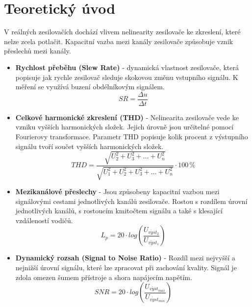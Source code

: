 \documentclass[a4paper, czech]{article}
\begin{document}
\section{Teoretický úvod}

V reálných zesilovačích dochází vlivem nelinearity zesilovače ke zkreslení, které nelze zcela potlačit.
Kapacitní vazba mezi kanály zesilovače způsobuje vznik přeslechů mezi kanály.

\begin{itemize}
    \item \textbf{Rychlost přeběhu (Slew Rate)} - dynamická vlastnost zesilovače, která popisuje jak rychle zesilovač sleduje skokovou změnu vstupního signálu. K měření se využívá buzení obdélníkovým signálem.
    \begin{equation*}
        SR = \frac{\Delta u}{\Delta t}
    \end{equation*}

    \item \textbf{Celkové harmonické zkreslení (THD)} - Nelinearita zesilovače vede ke vzniku vyšších harmonických složek. Jejich úrovně jsou určitelné pomocí Fourierovy transformace. Parametr THD popisuje kolik procent z výstupního signálu tvoří součet vyšších harmonických složek.
    \begin{equation*}
        THD = \frac{\sqrt{U_2^2 + U_3^2 + ... + U_n^2}}{\sqrt{U_1^2 + U_2^2 + U_3^2 + ... + U_n^2}} \cdot 100 \, \%
    \end{equation*}

    \item \textbf{Mezikanálové přeslechy} - Jsou způsobeny kapacitní vazbou mezi signálovými cestami jednotlivých kanálů zesilovače. Rostou s rozdílem úrovní jednotlivých kanálů, s rostoucím kmitočtem signálu a také s klesající vzdáleností vodičů.
    \begin{equation*}
        L_p = 20 \cdot log \left( \frac{U_{v \acute{y} st_2}}{U_{v \acute{y} st_1}} \right)
    \end{equation*}

    \item \textbf{Dynamický rozsah (Signal to Noise Ratio)} - Rozdíl mezi nejvyšší a nejnižší úrovní signálu, které lze zpracovat při zachování kvality. Signál je zdola omezen šumem přístroje a shora napájecím napětím.
    \begin{equation*}
        SNR = 20 \cdot log \left( \frac{U_{v \acute{y} st_{max}}}{U_{v \acute{y} st_{min}}} \right)
    \end{equation*}
\end{itemize}
\end{document}

